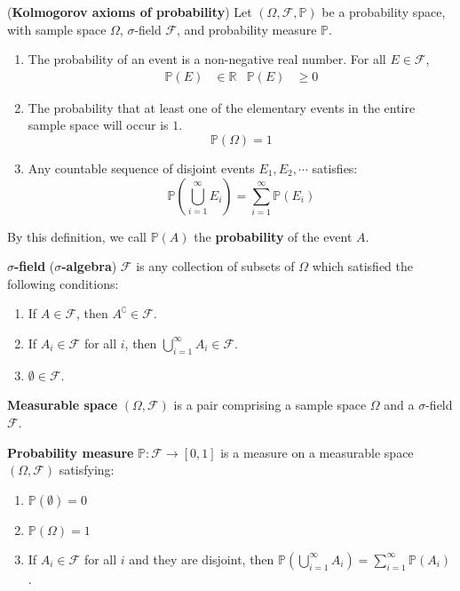 \documentclass{huhtakm-template-book}
\newcommand{\prob}{\mathbb{P}}
\begin{document}
\newpage
\begin{sdefn}(\textbf{Kolmogorov axioms of probability})
	Let $(\Omega,\mathcal{F},\prob)$ be a probability space, with sample space $\Omega$, $\sigma$-field $\mathcal{F}$, and probability measure $\prob$.
	\begin{enumerate}
		\item The probability of an event is a non-negative real number. For all $E\in\mathcal{F}$,
		\begin{align*}
			\prob(E)&\in\mathbb{R} & \prob(E)&\geq 0
		\end{align*}
		\item The probability that at least one of the elementary events in the entire sample space will occur is $1$.
		\begin{equation*}
			\prob(\Omega)=1
		\end{equation*}
		\item Any countable sequence of disjoint events $E_{1},E_{2},\cdots$ satisfies:
		\begin{equation*}
			\prob\left(\bigcup_{i=1}^{\infty}E_{i}\right)=\sum_{i=1}^{\infty}\prob(E_{i})
		\end{equation*}
	\end{enumerate}
	By this definition, we call $\prob(A)$ the \textbf{probability} of the event $A$.
\end{sdefn}
\begin{sdefn}
	\textbf{$\sigma$-field} (\textbf{$\sigma$-algebra}) $\mathcal{F}$ is any collection of subsets of $\Omega$ which satisfied the following conditions:
	\begin{enumerate}
		\item If $A\in\mathcal{F}$, then $A^{\complement}\in\mathcal{F}$.
		\item If $A_{i}\in\mathcal{F}$ for all $i$, then $\bigcup_{i=1}^{\infty}A_{i}\in\mathcal{F}$.
		\item $\emptyset\in\mathcal{F}$.
	\end{enumerate}
\end{sdefn}
\begin{sdefn}
	\textbf{Measurable space} $(\Omega,\mathcal{F})$ is a pair comprising a sample space $\Omega$ and a $\sigma$-field $\mathcal{F}$.
\end{sdefn}
\begin{sdefn}
	\textbf{Probability measure} $\prob:\mathcal{F}\to[0,1]$ is a measure on a measurable space $(\Omega,\mathcal{F})$ satisfying:
	\begin{enumerate}
		\item $\prob(\emptyset)=0$
		\item $\prob(\Omega)=1$
		\item If $A_{i}\in\mathcal{F}$ for all $i$ and they are disjoint, then $\prob(\bigcup_{i=1}^{\infty}A_{i})=\sum_{i=1}^{\infty}\prob(A_{i})$.
	\end{enumerate}
\end{sdefn}
\end{document}
